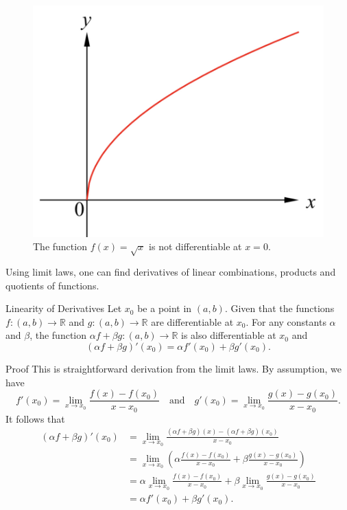  \begin{figure}[ht]
\centering
\includegraphics[scale=0.18]{Picture20.png}
\caption{  The function $f(x)=\sqrt{x}$ is not differentiable at $x=0$. \fa}\label{figure20}
\end{figure}

Using limit laws, one can find derivatives of linear combinations, products and quotients of  functions.
\begin{proposition}[label=23021305]{Linearity of Derivatives}
Let $x_0$ be a point in $(a, b)$. Given that the functions $f:(a,b)\to \mathbb{R}$ and $g:(a,b)\to \mathbb{R}$ are differentiable at $x_0$. For any constants $\alpha$ and $\beta$, the function $\alpha f+\beta g:(a,b)\rightarrow\mathbb{R}$ is also differentiable at $x_0$ and
\[(\alpha f+\beta g)'(x_0)=\alpha f'(x_0)+\beta g'(x_0).\]

\end{proposition}

\begin{myproof}{Proof}
This is straightforward derivation from the limit laws. By assumption, we have
\[f'(x_0)=\lim_{x\to x_0}\frac{f(x)-f(x_0)}{x-x_0}\quad\text{and}\quad g'(x_0)=\lim_{x\to x_0}\frac{g(x)-g(x_0)}{x-x_0}.\]
It follows that
\begin{align*}
(\alpha f+\beta g)'(x_0)&=\lim_{x\to x_0}\frac{(\alpha f+\beta g)(x)-(\alpha f+\beta g)(x_0)}{x-x_0}\\
&=\lim_{x\to x_0}\left(\alpha\frac{f(x)-f(x_0)}{x-x_0}+\beta\frac{g(x)-g(x_0)}{x-x_0}\right)\\
&=\alpha \lim_{x\to x_0}\frac{f(x)-f(x_0)}{x-x_0}+\beta \lim_{x\to x_0}\frac{g(x)-g(x_0)}{x-x_0}\\
&=\alpha f'(x_0)+\beta g'(x_0).
\end{align*}
\end{myproof}


